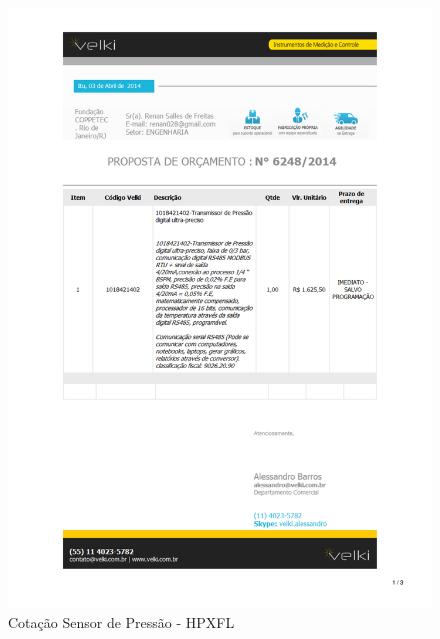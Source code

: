 \begin{figure}[h!]
 \centering
 \includegraphics[width=1\columnwidth]{Pressao/price_quote.pdf}
 \caption{Cotação Sensor de Pressão - HPXFL }
  
\end{figure}